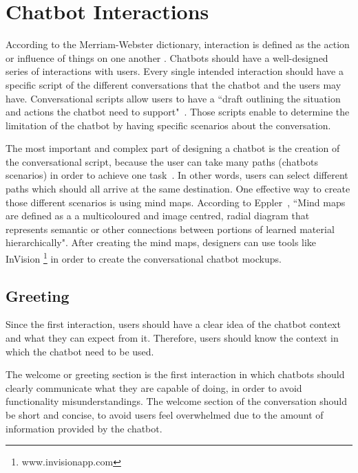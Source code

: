 \documentclass[a4paper,10pt]{article}
\begin{document}
\section{Chatbot Interactions}

According to the Merriam-Webster dictionary, interaction is defined as the action or influence of things on one another \cite{merriam-webster}.
Chatbots should have a well-designed series of interactions with users. Every single intended interaction should have a specific script of the different conversations that the chatbot and the users may have. Conversational scripts allow users to have a ``draft outlining the situation and actions the chatbot need to support"~\cite{CaseStudy}. Those scripts enable to determine the limitation of the chatbot by having specific scenarios about the conversation. 

The most important and complex part of designing a chatbot is the creation of the conversational script, because the user can take many paths (chatbots scenarios) in order to achieve one task~\cite{designChatbotConversatio}. In other words, users can select different paths which should all arrive at the same destination. One effective way to create those different scenarios is using mind maps. According to Eppler~\cite{eppler2006comparison}, ``Mind maps are defined as a a multicoloured and image centred, radial diagram that represents semantic or other connections between portions of learned material hierarchically". After creating the mind maps, designers can use tools like InVision \footnote{www.invisionapp.com} in order to create the conversational chatbot mockups.

\subsection{Greeting}
Since the first interaction, users should have a clear idea of the chatbot context and what they can expect from it. Therefore, users should know the context in which the chatbot need to be used.

The welcome or greeting section is the first interaction in which chatbots should clearly communicate what they are capable of doing, in order to avoid functionality misunderstandings. 
The welcome section of the conversation should be short and concise, to avoid users feel overwhelmed due to the amount of information provided by the chatbot. 
\end{document}
